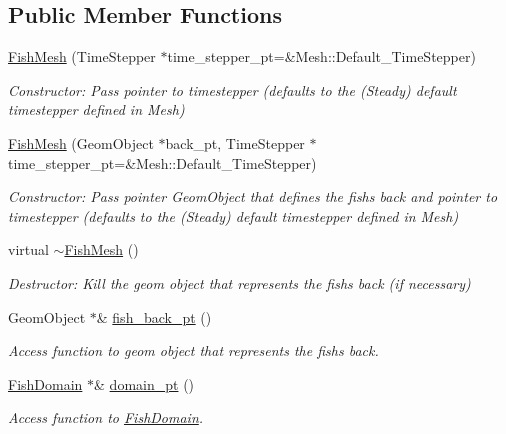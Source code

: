 \subsection*{Public Member Functions}
\begin{DoxyCompactItemize}
\item 
\hyperlink{classoomph_1_1FishMesh_a492c0535a4a0bf97729dfdff3754d211}{Fish\+Mesh} (Time\+Stepper $\ast$time\+\_\+stepper\+\_\+pt=\&Mesh\+::\+Default\+\_\+\+Time\+Stepper)
\begin{DoxyCompactList}\small\item\em Constructor\+: Pass pointer to timestepper (defaults to the (Steady) default timestepper defined in Mesh) \end{DoxyCompactList}\item 
\hyperlink{classoomph_1_1FishMesh_ac0b931509ec02c03f8ee5676355f196b}{Fish\+Mesh} (Geom\+Object $\ast$back\+\_\+pt, Time\+Stepper $\ast$time\+\_\+stepper\+\_\+pt=\&Mesh\+::\+Default\+\_\+\+Time\+Stepper)
\begin{DoxyCompactList}\small\item\em Constructor\+: Pass pointer Geom\+Object that defines the fish\textquotesingle{}s back and pointer to timestepper (defaults to the (Steady) default timestepper defined in Mesh) \end{DoxyCompactList}\item 
virtual \hyperlink{classoomph_1_1FishMesh_a3763b9be54c74d15a8c5b2129e0f4fae}{$\sim$\+Fish\+Mesh} ()
\begin{DoxyCompactList}\small\item\em Destructor\+: Kill the geom object that represents the fish\textquotesingle{}s back (if necessary) \end{DoxyCompactList}\item 
Geom\+Object $\ast$\& \hyperlink{classoomph_1_1FishMesh_aa6d659caf657ce5fd549431fadb009d7}{fish\+\_\+back\+\_\+pt} ()
\begin{DoxyCompactList}\small\item\em Access function to geom object that represents the fish\textquotesingle{}s back. \end{DoxyCompactList}\item 
\hyperlink{classoomph_1_1FishDomain}{Fish\+Domain} $\ast$\& \hyperlink{classoomph_1_1FishMesh_ad5076610d83a07e6306375a2632ee460}{domain\+\_\+pt} ()
\begin{DoxyCompactList}\small\item\em Access function to \hyperlink{classoomph_1_1FishDomain}{Fish\+Domain}. \end{DoxyCompactList}\end{DoxyCompactItemize}
